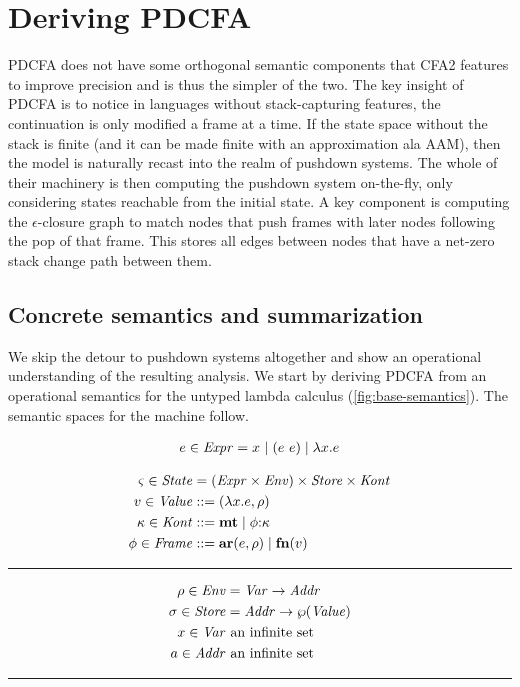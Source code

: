\section{Deriving PDCFA}
\label{sec:pdcfa}

PDCFA does not have some orthogonal semantic components that CFA2 features to improve precision and is thus the simpler of the two.
%
The key insight of PDCFA is to notice in languages without stack-capturing features, the continuation is only modified a frame at a time.
%
If the state space without the stack is finite (and it can be made finite with an approximation ala AAM), then the model is naturally recast into the realm of pushdown systems.
%
The whole of their machinery is then computing the pushdown system on-the-fly, only considering states reachable from the initial state.
%
A key component is computing the $\epsilon$-closure graph to match nodes that push frames with later nodes following the pop of that frame.
%
This stores all edges between nodes that have a net-zero stack change path between them.
%

\subsection{Concrete semantics and summarization}
We skip the detour to pushdown systems altogether and show an operational understanding of the resulting analysis.
%
We start by deriving PDCFA from an operational semantics for the untyped lambda calculus (\autoref{fig:base-semantics}).
%
The semantic spaces for the machine follow.

{
\setlength{\abovedisplayskip}{0pt}
\setlength{\belowdisplayskip}{4pt}
\setlength{\abovedisplayshortskip}{0pt}
\setlength{\belowdisplayshortskip}{8pt}
\begin{align*}
  e \in \mathit{Expr} = x^{{}} \mathrel{\mid} (e\ e){} \mathrel{\mid} \lambda{} x. e
\end{align*}
\begin{minipage}[b]{.55\linewidth}
  \begin{align*}
  \varsigma \in \mathit{State} &= (\mathit{Expr} \times \mathit{Env}) \times \mathit{Store} \times \mathit{Kont} \\
  v \in \mathit{Value} &::= (\lambda{} x. e, \rho) \\
  \kappa \in \mathit{Kont} &::= \mathbf{mt} \mathrel{\mid} \phi{\tt :} \kappa \\
  \phi \in \mathit{Frame} &::= \mathbf{ar}{}(e,\rho) \mathrel{\mid} \mathbf{fn}{}(v)
  \end{align*}\hrule height 0pt\end{minipage}
\begin{minipage}[b]{.40\linewidth}
  \begin{align*}
  \rho \in \mathit{Env} &= \mathit{Var} \to \mathit{Addr} \\
  \sigma \in \mathit{Store} &= \mathit{Addr} \to \wp(\mathit{Value}) \\
  x \in \mathit{Var} &\text{ an infinite set} \\
  a \in \mathit{Addr} &\text{ an infinite set}
  \end{align*}\hrule height 0pt\end{minipage}
}

